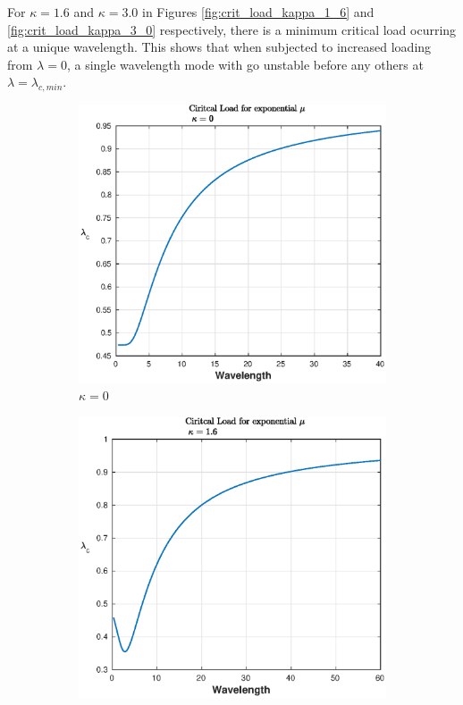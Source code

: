 \documentclass[11pt]{report}
\begin{document}
For $\kappa = 1.6$ and $\kappa = 3.0$ in Figures \ref{fig:crit_load_kappa_1_6} and \ref{fig:crit_load_kappa_3_0} respectively, there is a minimum critical load ocurring at a unique wavelength. This shows that when subjected to increased loading from $\lambda = 0$, a single wavelength mode with go unstable before any others at $\lambda = \lambda_{c,min}$.
\begin{figure}[!htb]
	\begin{subfigure}[b]{0.33\textwidth}
		\includegraphics[width=\textwidth]{crit_load_kappa_0}
		\caption{$\kappa = 0$}
		\label{fig:crit_load_kappa_0}
	\end{subfigure}
	\begin{subfigure}[b]{0.33\textwidth}
		\includegraphics[width=\textwidth]{crit_load_kappa_1_6}

\end{subfigure}
\end{figure}
\end{document}
